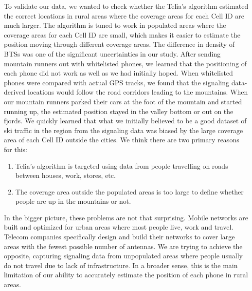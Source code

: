 \documentclass[authordate,empirical, issue]{jote-new-article}
\begin{document}
To validate our data, we wanted to check whether the Telia’s algorithm estimated the correct locations in rural areas where the coverage areas for each Cell ID are much larger. The algorithm is tuned to work in populated areas where the coverage areas for each Cell ID are small, which makes it easier to estimate the position moving through different coverage areas. The difference in density of BTSs was one of the significant uncertainties in our study. After sending mountain runners out with whitelisted phones, we learned that the positioning of each phone did not work as well as we had initially hoped. When whitelisted phones were compared with actual GPS tracks, we found that the signaling data-derived locations would follow the road corridors leading to the mountains. When our mountain runners parked their cars at the foot of the mountain and started running up, the estimated position stayed in the valley bottom or out on the fjords. We quickly learned that what we initially believed to be a good dataset of ski traffic in the region from the signaling data was biased by the large coverage area of each Cell ID outside the cities. We think there are two primary reasons for this:





\begin{enumerate}


  \item Telia’s algorithm is targeted using data from people travelling on roads between houses, work, stores, etc.



  \item
        The coverage area outside the populated areas is too large to define whether people are up in the mountains or not.


\end{enumerate}





In the bigger picture, these problems are not that surprising. Mobile networks are built and optimized for urban areas where most people live, work and travel. Telecom companies specifically design and build their networks to cover large areas with the fewest possible number of antennas. We are trying to achieve the opposite, capturing signaling data from unpopulated areas where people usually do not travel due to lack of infrastructure. In a broader sense, this is the main limitation of our ability to accurately estimate the position of each phone in rural areas.
\end{document}

